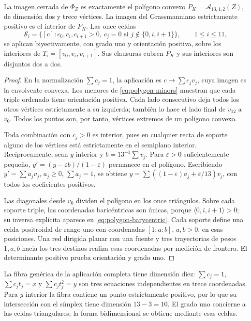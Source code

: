 \begin{theorem}
\label{thm:polygon-amplituhedron}
La imagen cerrada de \(\Phi_Z\) es exactamente el polígono convexo
\(P_K=\mathcal A_{13,1,2}(Z)\), de dimensión dos y trece vértices. La imagen
del Grassmanniano estrictamente positivo es el interior de \(P_K\).
Las once celdas
\begin{equation}
 \mathcal S_i=\{[c]:c_0,c_i,c_{i+1}>0,\
 c_j=0\text{ si }j\notin\{0,i,i+1\}\},\qquad 1\leq i\leq11,
 \label{eq:polygon-cells}
\end{equation}
se aplican biyectivamente, con grado uno y orientación positiva, sobre los
interiores de \(T_i=[v_0,v_i,v_{i+1}]\). Sus clausuras cubren \(P_K\) y sus
interiores son disjuntos dos a dos.
\end{theorem}
\begin{proof}
En la normalización \(\sum c_j=1\), la aplicación es
\(c\mapsto\sum c_jv_j\), cuya imagen es la envolvente convexa. Los menores
de \eqref{eq:polygon-minors} muestran que cada triple ordenado tiene
orientación positiva. Cada lado consecutivo deja todos los otros vértices
estrictamente a su izquierda; también lo hace el lado final de \(v_{12}\)
a \(v_0\). Todos los puntos son, por tanto, vértices extremos de un polígono
convexo.

Toda combinación con \(c_j>0\) es interior, pues en cualquier recta de
soporte alguno de los vértices está estrictamente en el semiplano
interior. Recíprocamente, sean \(y\) interior y
\(b=13^{-1}\sum v_j\). Para \(\varepsilon>0\) suficientemente pequeño,
\(y'=(y-\varepsilon b)/(1-\varepsilon)\) permanece en el polígono.
Escribiendo \(y'=\sum a_jv_j\), \(a_j\geq0\), \(\sum a_j=1\), se obtiene
\(y=\sum((1-\varepsilon)a_j+\varepsilon/13)v_j\), con todos los
coeficientes positivos.

Las diagonales desde \(v_0\) dividen el polígono en los once triángulos.
Sobre cada soporte triple, las coordenadas baricéntricas son únicas,
porque \(\langle0,i,i+1\rangle>0\); su inversa explícita aparece en
\eqref{eq:polygon-barycentric}. Cada soporte define una celda positroidal
de rango uno con coordenadas \([1:a:b]\), \(a,b>0\), en esas posiciones.
Una red dirigida planar con una fuente y tres trayectorias de pesos
\(1,a,b\) hacia los tres destinos realiza esas coordenadas por medición
de frontera. El determinante positivo prueba orientación y grado uno.
\end{proof}

La fibra genérica de la aplicación completa tiene dimensión diez:
\(\sum c_j=1\), \(\sum c_jt_j=x\) y \(\sum c_jt_j^2=y\) son tres
ecuaciones independientes en trece coordenadas. Para \(y\) interior la
fibra contiene un punto estrictamente positivo, por lo que su intersección
con el símplex tiene dimensión \(13-3=10\). El grado uno concierne a las
celdas triangulares; la forma bidimensional se obtiene mediante esas
celdas.

